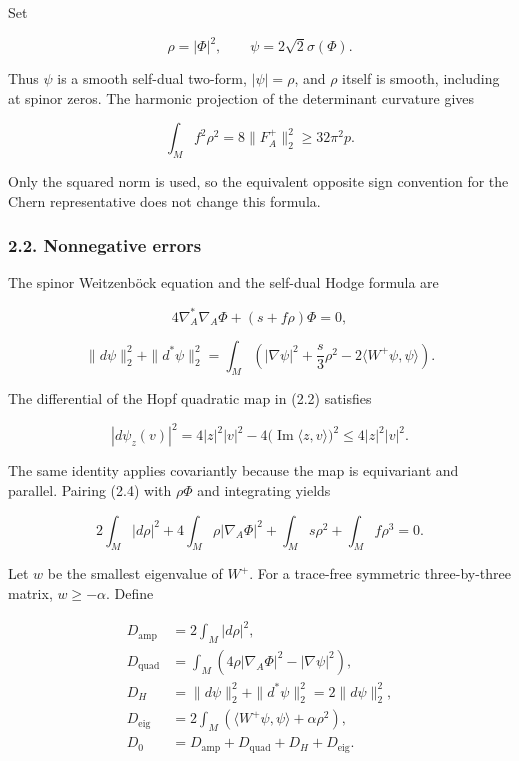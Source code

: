 \documentclass[
  10pt,
]{article}
\begin{document}
Set

\[
             \rho=|\Phi|^2,\qquad \psi=2\sqrt2\sigma(\Phi).
 \tag{2.2}
\]

Thus \(\psi\) is a smooth self-dual two-form, \(|\psi|=\rho\), and
\(\rho\) itself is smooth, including at spinor zeros. The harmonic
projection of the determinant curvature gives

\[
 \int_M f^2\rho^2=8\|F_A^+\|_2^2\ge32\pi^2p.           \tag{2.3}
\]

Only the squared norm is used, so the equivalent opposite sign
convention for the Chern representative does not change this formula.

\hypertarget{nonnegative-errors}{%
\subsubsection{2.2. Nonnegative errors}\label{nonnegative-errors}}

The spinor Weitzenböck equation and the self-dual Hodge formula are

\[
 4\nabla_A^*\nabla_A\Phi+(s+f\rho)\Phi=0,                \tag{2.4}
\]

\[
 \|d\psi\|_2^2+\|d^*\psi\|_2^2
   =\int_M\left(|\nabla\psi|^2+\frac{s}{3}\rho^2
                                  -2\langle W^+\psi,\psi\rangle\right).
 \tag{2.5}
\]

The differential of the Hopf quadratic map in (2.2) satisfies

\[
 |d\psi_z(v)|^2
       =4|z|^2|v|^2-4\bigl(\operatorname{Im}\langle z,v\rangle\bigr)^2
       \le4|z|^2|v|^2.                                   \tag{2.6}
\]

The same identity applies covariantly because the map is equivariant and
parallel. Pairing (2.4) with \(\rho\Phi\) and integrating yields

\[
 2\int_M|d\rho|^2+4\int_M\rho|\nabla_A\Phi|^2
                  +\int_Ms\rho^2+\int_M f\rho^3=0.       \tag{2.7}
\]

Let \(w\) be the smallest eigenvalue of \(W^+\). For a trace-free
symmetric three-by-three matrix, \(w\ge-\alpha\). Define

\[
 \begin{aligned}
 D_{\mathrm{amp}}&=2\int_M|d\rho|^2,\\
 D_{\mathrm{quad}}&=\int_M(4\rho|\nabla_A\Phi|^2-|\nabla\psi|^2),\\
 D_H&=\|d\psi\|_2^2+\|d^*\psi\|_2^2=2\|d\psi\|_2^2,\\
 D_{\mathrm{eig}}&=2\int_M
           (\langle W^+\psi,\psi\rangle+\alpha\rho^2),\\
 D_0&=D_{\mathrm{amp}}+D_{\mathrm{quad}}+D_H+D_{\mathrm{eig}}.
 \end{aligned}                                              \tag{2.8}
\]
\end{document}
